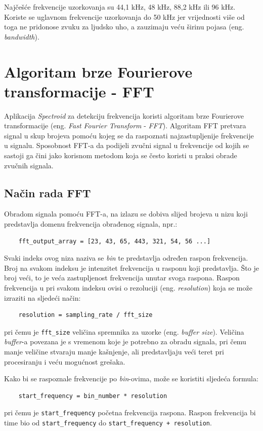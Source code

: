 \documentclass[times, utf8, zavrsni, numeric]{fer}
\begin{document}
Najčešće frekvencije uzorkovanja su 44,1 kHz, 48 kHz, 88,2 kHz ili 96 kHz.\cite{self2012audio} Koriste se uglavnom frekvencije uzorkovanja do 50 kHz jer vrijednosti više od toga ne pridonose zvuku za ljudsko uho, a zauzimaju veću širinu pojasa (eng. \textit{bandwidth}).

\chapter{Algoritam brze Fourierove transformacije - FFT}
Aplikacija \textit{Spectroid} za detekciju frekvencija koristi algoritam brze Fourierove transformacije (eng. \textit{Fast Fourier Transform} - \textit{FFT}). Algoritam FFT pretvara signal u skup brojeva pomoću kojeg se da raspoznati najzastupljenije frekvencije u signalu. Sposobnost FFT-a da podijeli zvučni signal u frekvencije od kojih se sastoji ga čini jako korisnom metodom koja se često koristi u praksi obrade zvučnih signala.\cite{gustine_2021}

\section{Način rada FFT}
Obradom signala pomoću FFT-a, na izlazu se dobiva slijed brojeva u nizu koji predstavlja domenu frekvencija obrađenog signala, npr.:
\begin{verbatim}
	fft_output_array = [23, 43, 65, 443, 321, 54, 56 ...]
\end{verbatim}
Svaki indeks ovog niza naziva se \textit{bin} te predstavlja određen raspon frekvencija. Broj na svakom indeksu je intenzitet frekvencija u rasponu koji predstavlja. Što je broj veći, to je veća zastupljenost frekvencija unutar svoga raspona. Raspon frekvencija u pri svakom indeksu ovisi o rezoluciji (eng. \textit{resolution}) koja se može izraziti na sljedeći način:
\begin{verbatim}
	resolution = sampling_rate / fft_size
\end{verbatim}
pri čemu je \verb|fft_size| veličina spremnika za uzorke (eng. \textit{buffer size}).\cite{lourde2009digital} Veličina \textit{buffer}-a povezana je s vremenom koje je potrebno za obradu signala, pri čemu manje veličine stvaraju manje kašnjenje, ali predstavljaju veći teret pri procesiranju i veću mogućnost grešaka.\cite{focusrite_2022}

Kako bi se raspoznale frekvencije po \textit{bin}-ovima, može se koristiti sljedeća formula:
\begin{verbatim}
	start_frequency = bin_number * resolution
\end{verbatim}
pri čemu je \verb|start_frequency| početna frekvencija raspona.\cite{gustine_2021} Raspon frekvencija bi time bio od \verb|start_frequency| do \verb|start_frequency + resolution|.
\end{document}
